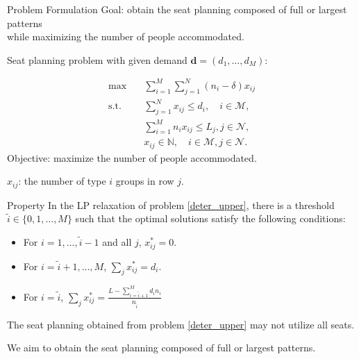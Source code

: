 \begin{frame}{Problem Formulation}  %
  Goal: obtain the seat planning composed of {\color{red}full or largest patterns} \\ 
        \hspace{1cm} while {\color{red}maximizing the number of people} accommodated.
  \small
    \vspace{0.2cm}

    Seat planning problem with given demand $\bm{d}= (d_1,\ldots,d_{M})$:

    \begin{equation}\label{deter_upper}
      \begin{aligned}
      \max \quad & \sum_{i=1}^{M}  \sum_{j= 1}^{N} (n_i- \delta) x_{ij} \\
      \text {s.t.} \quad & \sum_{j= 1}^{N} x_{ij} \leq d_{i}, \quad i \in \mathcal{M}, \\
      & \sum_{i=1}^{M} n_{i} x_{ij} \leq L_j, j \in \mathcal{N}, \\
      & x_{ij} \in \mathbb{N}, \quad i \in \mathcal{M}, j \in \mathcal{N}.
      \end{aligned}
    \end{equation}
    Objective: {\color{green} maximize the number of people accommodated}.

    $x_{ij}$: the number of type $i$ groups in row $j$.
  \end{frame}

  \begin{frame}{Property}
    In the LP relaxation of problem \eqref{deter_upper}, there is a threshold $\tilde{i} \in\{0,1,\ldots, M\}$ such that the optimal solutions satisfy the following conditions:

    \begin{itemize}
      \item For $i = 1,\ldots, \tilde{i} -1$ and all $j$, $x_{ij}^{*} = 0$. 
      \item For $i = \tilde{i} +1,\ldots, M$, $\sum_{j} x_{ij}^{*} = d_{i}$. 

      \item For $i = \tilde{i}$, $\sum_{j} x_{ij}^{*} = \frac{L - \sum_{i = \tilde{i}+1}^{M} {d_i n_i}}{n_{\tilde{i}}}$ 
    \end{itemize}

    \vspace{0.5cm}
    The seat planning obtained from problem \eqref{deter_upper} may not utilize all seats.

    \vspace{0.5cm}
    
    We aim to obtain the {\color{green} seat planning composed of full or largest patterns}.

  \end{frame}

